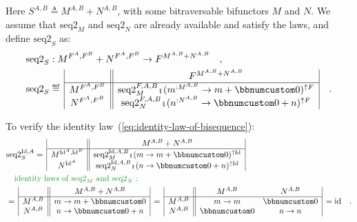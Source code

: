 Here $S^{A,B}\triangleq M^{A,B}+N^{A,B}$, with some bitraversable
bifunctors $M$ and $N$. We assume that $\text{seq2}_{M}$ and $\text{seq2}_{N}$
are already available and satisfy the laws, and define $\text{seq2}_{S}$
as:
\begin{align*}
 & \text{seq2}_{S}:M^{F^{A},F^{B}}+N^{F^{A},F^{B}}\rightarrow F^{M^{A,B}+N^{A,B}}\quad,\\
 & \text{seq2}_{S}\triangleq\,\begin{array}{|c||c|}
 & F^{M^{A,B}+N^{A,B}}\\
\hline M^{F^{A},F^{B}} & \text{seq2}_{M}^{F,A,B}\bef(m^{:M^{A,B}}\rightarrow m+\bbnum 0)^{\uparrow F}\\
N^{F^{A},F^{B}} & \text{seq2}_{N}^{F,A,B}\bef(n^{:N^{A,B}}\rightarrow\bbnum 0+n)^{\uparrow F}
\end{array}\quad.
\end{align*}

To verify the identity law~(\ref{eq:identity-law-of-bisequence}):
\begin{align*}
 & \text{seq2}_{S}^{\text{Id},A}=\,\begin{array}{|c||c|}
 & M^{A,B}+N^{A,B}\\
\hline M^{\text{Id}^{A},\text{Id}^{B}} & \text{seq2}_{M}^{\text{Id},A,B}\bef(m\rightarrow m+\bbnum 0)^{\uparrow\text{Id}}\\
N^{\text{Id}^{A}} & \text{seq2}_{N}^{\text{Id},A,B}\bef(n\rightarrow\bbnum 0+n)^{\uparrow\text{Id}}
\end{array}\\
 & \quad{\color{greenunder}\text{identity laws of }\text{seq2}_{M}\text{ and }\text{seq2}_{N}:}\quad\\
 & =\,\begin{array}{|c||c|}
 & M^{A,B}+N^{A,B}\\
\hline M^{A,B} & m\rightarrow m+\bbnum 0\\
N^{A,B} & n\rightarrow\bbnum 0+n
\end{array}\,=\,\begin{array}{|c||cc|}
 & M^{A,B} & N^{A,B}\\
\hline M^{A,B} & m\rightarrow m & \bbnum 0\\
N^{A,B} & \bbnum 0 & n\rightarrow n
\end{array}\,=\text{id}\quad.
\end{align*}

